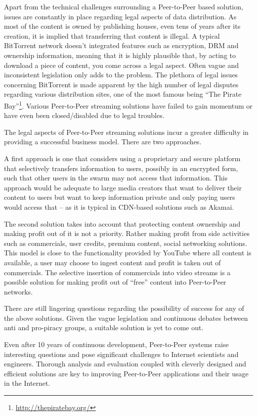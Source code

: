 Apart from the technical challenges surrounding a Peer-to-Peer based solution,
issues are constantly in place regarding legal aspects of data distribution.
As most of the content is owned by publishing houses, even tens of years after
its creation, it is implied that transferring that content is illegal. A
typical BitTorrent network doesn't integrated features such as encryption, DRM
and ownership information, meaning that it is highly plausible that, by acting
to download a piece of content, you come across a legal aspect. Often vague
and inconsistent legislation only adds to the problem. The plethora of legal
issues concerning BitTorrent is made apparent by the high number of legal
disputes regarding various distribution sites, one of the most famous being
``The Pirate Bay''\footnote{\url{http://thepiratebay.org/}}. Various Peer-to-Peer
streaming solutions have failed to gain momentum or have even been
closed/disabled due to legal troubles.

The legal aspects of Peer-to-Peer streaming solutions incur a greater
difficulty in providing a successful business model. There are two approaches.

A first approach is one that considers using a proprietary and secure platform
that selectively transfers information to users, possibly in an encrypted
form, such that other users in the swarm may not access that information. This
approach would be adequate to large media creators that want to deliver their
content to users but want to keep information private and only paying users
would access that -- as it is typical in CDN-based solutions such as Akamai.

The second solution takes into account that protecting content ownership and
making profit out of it is not a priority. Rather making profit from side
activities such as commercials, user credits, premium content, social
networking solutions. This model is close to the functionality provided by
YouTube where all content is available, a user may choose to ingest content
and profit is taken out of commercials. The selective insertion of commercials
into video streams is a possible solution for making profit out of ``free''
content into Peer-to-Peer networks.

There are still lingering questions regarding the possibility of success for
any of the above solutions. Given the vague legislation and continuous debates
between anti and pro-piracy groups, a suitable solution is yet to come out.

Even after 10 years of continuous development, Peer-to-Peer systems raise
interesting questions and pose significant challenges to Internet scientists
and engineers. Thorough analysis and evaluation coupled with cleverly
designed and efficient solutions are key to improving Peer-to-Peer
applications and their usage in the Internet.
